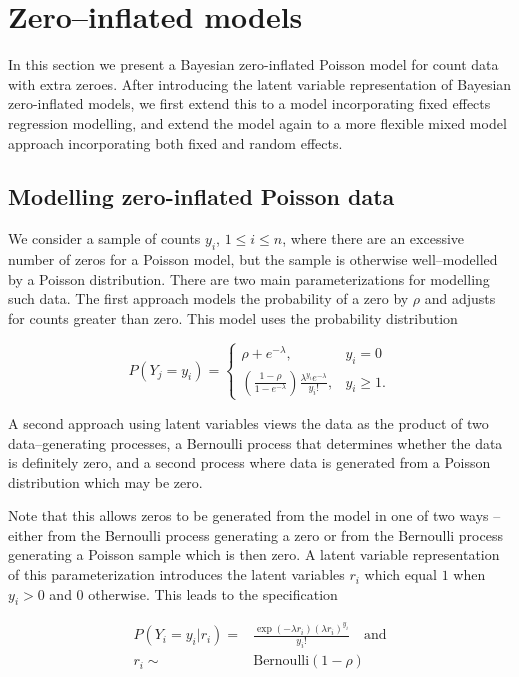 \section{Zero--inflated models}
\label{sec:model}

In this section we present a Bayesian zero-inflated Poisson model for count data with extra zeroes. After
introducing the latent variable representation of Bayesian zero-inflated models, we first extend this to a
model incorporating fixed effects regression modelling, and extend the model again to a more flexible mixed
model approach incorporating both fixed and random effects.

\subsection{Modelling zero-inflated Poisson data}

We consider a sample of counts $y_i$, $1 \le i\le n$, where there are an excessive number of zeros for a
Poisson model, but the sample is otherwise well--modelled by a Poisson distribution. There are two main
parameterizations for modelling such data. The first approach models the probability of a zero by $\rho$ and
adjusts for counts greater than zero. This model uses the probability distribution

\begin{equation}
	P(Y_j = y_i) = \left\{ \begin{array}{ll}
	\rho + e^{-\lambda},  & y_i = 0 \\
	\left( \frac{1 - \rho}{1 - e^{-\lambda}} \right) \frac{\lambda^{y_i} e^{-\lambda}} {y_i!},  &y_i \ge 1.
	\end{array} \right.
\end{equation}

A second approach using latent variables views the data as the product of two data--generating processes, a
Bernoulli process that determines whether the data is definitely zero, and a second process where data is
generated from a Poisson distribution which may be zero.

Note that this allows zeros to be generated from the model in one of two ways -- either from the Bernoulli
process generating a zero or from the Bernoulli process generating a Poisson sample which is then zero. A
latent variable representation of this parameterization introduces the latent variables $r_i$ which equal $1$
when $y_i>0$ and $0$ otherwise. This leads to the specification

\begin{equation}
\begin{array}{rl}
	P(Y_i=y_i|r_i) = & \frac{\exp(-\lambda r_i)(\lambda r_i)^{y_i}}{y_i!} \quad \mbox{and} \\
	r_i \sim & \mbox{Bernoulli}(1-\rho)
\end{array}
\end{equation}

